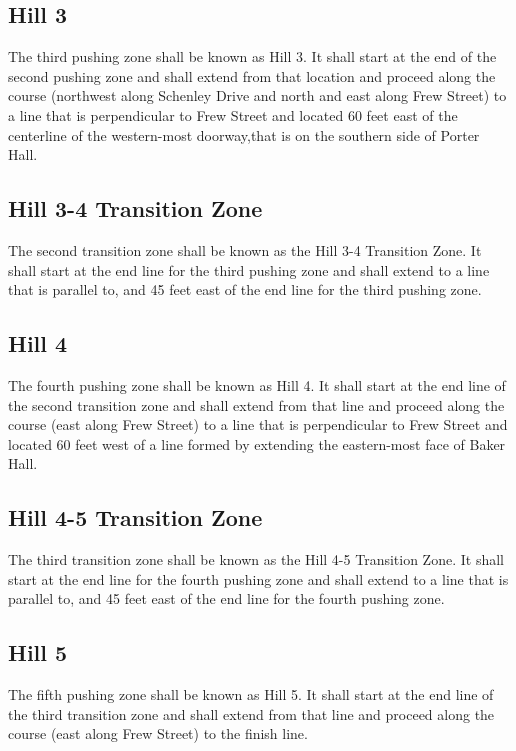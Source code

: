 \documentclass[openany]{book}
\begin{document}
\subsection{Hill 3}

The third pushing zone shall be known as Hill 3. It shall start at the end of the second pushing zone and shall extend from that location and proceed along the course (northwest along Schenley Drive and north and east along Frew Street) to a line that is perpendicular to Frew Street and located 60 feet east of the centerline of the western-most doorway,that is on the southern side of Porter Hall.

\subsection{Hill 3-4 Transition Zone}

The second transition zone shall be known as the Hill 3-4 Transition Zone. It shall start at the end line for the third pushing zone and shall extend to a line that is parallel to, and 45 feet east of the end line for the third pushing zone.

\subsection{Hill 4}

The fourth pushing zone shall be known as Hill 4. It shall start at the end line of the second transition zone and shall extend from that line and proceed along the course (east along Frew Street) to a line that is perpendicular to Frew Street and located 60 feet west of a line formed by extending the eastern-most face of Baker Hall.

\subsection{Hill 4-5 Transition Zone}

The third transition zone shall be known as the Hill 4-5 Transition Zone. It shall start at the end line for the fourth pushing zone and shall extend to a line that is parallel to, and 45 feet east of the end line for the fourth pushing zone.

\subsection{Hill 5}

The fifth pushing zone shall be known as Hill 5. It shall start at the end line of the third transition zone and shall extend from that line and proceed along the course (east along Frew Street) to the finish line.
\end{document}
